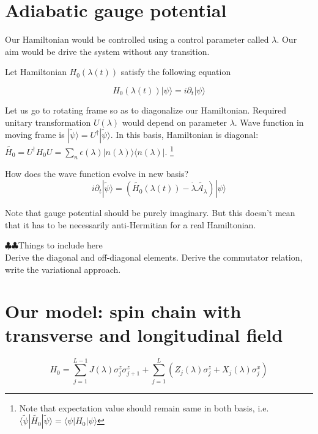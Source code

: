 \documentclass[11pt,a4paper]{article}
\begin{document}
\section{Adiabatic gauge potential}
Our Hamiltonian would be controlled using a control parameter called $\lambda$. Our aim would be drive the system without any transition.

Let Hamiltonian $H_0(\lambda (t))$ satisfy the following equation

\begin{equation}
H_0(\lambda (t)) |\psi \rangle= i \partial_t|\psi \rangle
\end{equation}

Let us go to rotating frame so as to diagonalize our Hamiltonian. Required unitary transformation $U(\lambda)$ would depend on parameter $\lambda$. Wave function in moving frame is $|\tilde{\psi}  \rangle = U^{\dagger} |\tilde{\psi}  \rangle$. In this basis, Hamiltonian is diagonal:
$\tilde{H_0}= U^{\dagger} H_0 U = \sum_n \epsilon (\lambda)  |n (\lambda)\rangle \langle  n (\lambda) |$. \footnote{Note that expectation value should remain same in both basis, i.e.$ \langle \tilde{\psi} | \tilde{H_0}  |\tilde{\psi}  \rangle= \langle{\psi} | {H_0}  |{\psi}  \rangle$}

How does the wave function evolve in new basis?
\begin{equation}
 i \partial_t|\tilde{\psi} \rangle=(\tilde{H_0
 }(\lambda (t)) - \dot{\lambda} \tilde{\mathcal{A_\lambda}}) |\psi \rangle
\end{equation}

Note that gauge potential should be purely imaginary. But this doesn't mean that it has to be necessarily anti-Hermitian for a real Hamiltonian.

$\clubsuit \clubsuit $Things to include here \\
Derive the diagonal and off-diagonal elements. Derive the commutator relation, write the variational approach.

\section{Our model: spin chain with transverse and longitudinal field}

\begin{equation}
H_0=\sum_{j=1}^{L-1} J(\lambda) \sigma_j^z \sigma_{j+1}^z + \sum_{j=1}^{L}  (Z_j (\lambda) \sigma_j^z +X_j (\lambda) \sigma_j^x)
\end{equation}
\end{document}
